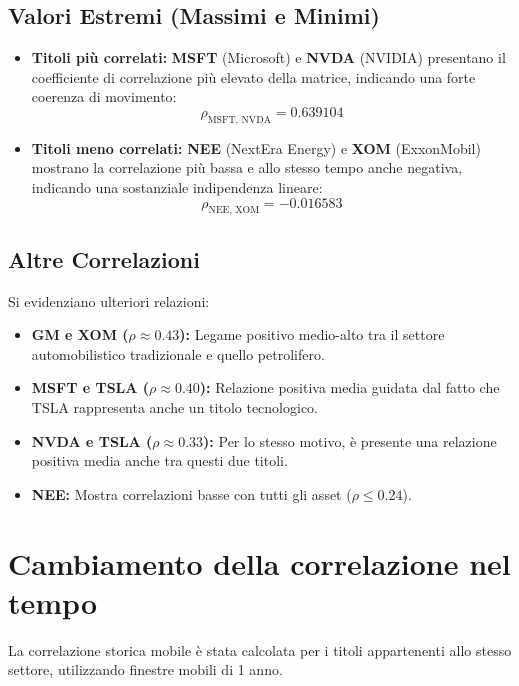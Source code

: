 \documentclass[11pt, a4paper]{report} %
\begin{document}
\subsection{Valori Estremi (Massimi e Minimi)}
\begin{itemize}
    \item \textbf{Titoli più correlati:} \textbf{MSFT} (Microsoft) e \textbf{NVDA} (NVIDIA) presentano il coefficiente di correlazione più elevato della matrice, indicando una forte coerenza di movimento:
    \[
    \rho_{\text{MSFT, NVDA}} = 0.639104
    \]
    
    \item \textbf{Titoli meno correlati:} \textbf{NEE} (NextEra Energy) e \textbf{XOM} (ExxonMobil) mostrano la correlazione più bassa e allo stesso tempo anche negativa, indicando una sostanziale indipendenza lineare:
    \[
    \rho_{\text{NEE, XOM}} = -0.016583
    \]
\end{itemize}

\subsection{Altre Correlazioni}
Si evidenziano ulteriori relazioni:

\begin{itemize}
    \item \textbf{GM e XOM ($\rho \approx 0.43$):} Legame positivo medio-alto tra il settore automobilistico tradizionale e quello petrolifero.
    
    \item \textbf{MSFT e TSLA ($\rho \approx 0.40$):} Relazione positiva media guidata dal fatto che TSLA rappresenta anche un titolo tecnologico.
    
    \item \textbf{NVDA e TSLA ($\rho \approx 0.33$):} Per lo stesso motivo, è presente una relazione positiva media anche tra questi due titoli.
    
    \item \textbf{NEE:} Mostra correlazioni basse con tutti gli asset ($\rho \le 0.24$).
\end{itemize}

\section{Cambiamento della correlazione nel tempo}
La correlazione storica mobile è stata calcolata per i titoli appartenenti allo stesso settore, utilizzando finestre mobili di 1 anno.
\end{document}
